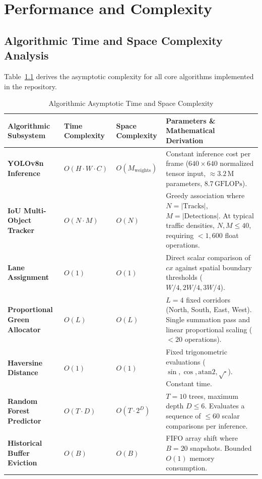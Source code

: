 \chapter{Performance and Complexity}

\section{Algorithmic Time and Space Complexity Analysis}
Table~\ref{tab:complexity_table} derives the asymptotic complexity for all core algorithms implemented in the repository.

\begin{table}[h!]
\centering
\small
\begin{tabularx}{\textwidth}{p{3.5cm} p{2cm} p{2cm} X}
\toprule
\textbf{Algorithmic Subsystem} & \textbf{Time Complexity} & \textbf{Space Complexity} & \textbf{Parameters \& Mathematical Derivation} \\
\midrule
\textbf{YOLOv8n Inference} & $O(H \cdot W \cdot C)$ & $O(M_{\text{weights}})$ & Constant inference cost per frame ($640 \times 640$ normalized tensor input, $\approx 3.2\,\text{M}$ parameters, $8.7\,\text{GFLOPs}$). \\
\textbf{IoU Multi-Object Tracker} & $O(N \cdot M)$ & $O(N)$ & Greedy association where $N = |\text{Tracks}|$, $M = |\text{Detections}|$. At typical traffic densities, $N, M \le 40$, requiring $< 1,600$ float operations. \\
\textbf{Lane Assignment} & $O(1)$ & $O(1)$ & Direct scalar comparison of $cx$ against spatial boundary thresholds ($W/4, 2W/4, 3W/4$). \\
\textbf{Proportional Green Allocator} & $O(L)$ & $O(L)$ & $L = 4$ fixed corridors (North, South, East, West). Single summation pass and linear proportional scaling ($< 20$ operations). \\
\textbf{Haversine Distance} & $O(1)$ & $O(1)$ & Fixed trigonometric evaluations ($\sin, \cos, \text{atan2}, \sqrt{\cdot}$). Constant time. \\
\textbf{Random Forest Predictor} & $O(T \cdot D)$ & $O(T \cdot 2^D)$ & $T = 10$ trees, maximum depth $D \le 6$. Evaluates a sequence of $\le 60$ scalar comparisons per inference. \\
\textbf{Historical Buffer Eviction} & $O(B)$ & $O(B)$ & FIFO array shift where $B = 20$ snapshots. Bounded $O(1)$ memory consumption. \\
\bottomrule
\end{tabularx}
\caption{Algorithmic Asymptotic Time and Space Complexity}
\label{tab:complexity_table}
\end{table}

